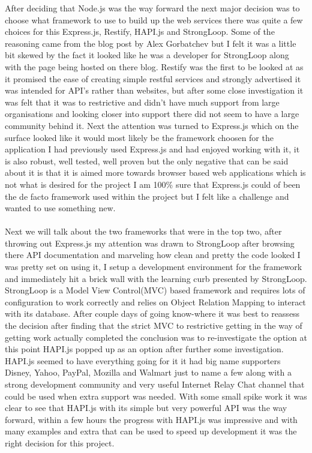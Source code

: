 After deciding that Node.js was the way forward the next major decision was to choose what framework to use to build up the web services there was quite a few choices for this Express.js, Restify, HAPI.js and StrongLoop. Some of the reasoning came from the blog post by Alex Gorbatchev \cite{AlexGorbatchev:CompairingExpressRestifyHapLoopBack:2015:online} but I felt it was a little bit skewed by the fact it looked like he was a developer for StrongLoop along with the page being hosted on there blog. Restify was the first to be looked at as it promised the ease of creating simple restful services and strongly advertised it was intended for API's rather than websites, but after some close investigation it was felt that it was to restrictive and didn't have much support from large organisations and looking closer into support there did not seem to have a large community behind it. Next the attention was turned to Express.js which on the surface looked like it would most likely be the framework choosen for the application I had previously used Express.js and had enjoyed working with it, it is also robust, well tested, well proven but the only negative that can be said about it is that it is aimed more towards browser based web applications which is not what is desired for the project I am 100\% sure that Express.js could of been the de facto framework used within the project but I felt like a challenge and wanted to use something new.\\
\\
Next we will talk about the two frameworks that were in the top two, after throwing out Express.js my attention was drawn to StrongLoop after browsing there API documentation and marveling how clean and pretty the code looked I was pretty set on using it, I setup a development environment for the framework and immediately hit a brick wall with the learning curb presented by StrongLoop. StrongLoop is a Model View Control(MVC) based framework and requires lots of configuration to work correctly and relies on Object Relation Mapping to interact with its database. After couple days of going know-where it was best to reassess the decision after finding that the strict MVC to restrictive getting in the way of getting work actually completed the conclusion was to re-investigate the option at this point HAPI.js popped up as an option after further some investigation. HAPI.js seemed to have everything going for it it had big name supporters Disney, Yahoo, PayPal, Mozilla and Walmart just to name a few along with a strong development community and very useful Internet Relay Chat channel that could be used when extra support was needed. With some small spike work it was clear to see that HAPI.js with its simple but very powerful API was the way forward, within a few hours the progress with HAPI.js was impressive and with many examples and extra that can be used to speed up development it was the right decision for this project.


